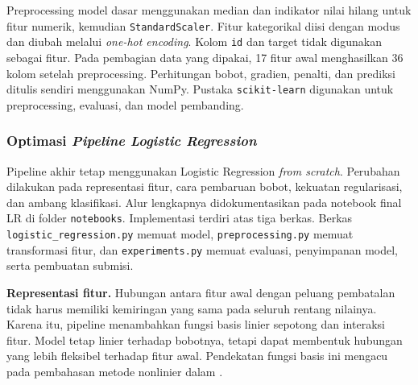 Preprocessing model dasar menggunakan median dan indikator nilai hilang untuk fitur numerik, kemudian \texttt{StandardScaler}. Fitur kategorikal diisi dengan modus dan diubah melalui \textit{one-hot encoding}. Kolom \texttt{id} dan target tidak digunakan sebagai fitur. Pada pembagian data yang dipakai, 17 fitur awal menghasilkan 36 kolom setelah preprocessing. Perhitungan bobot, gradien, penalti, dan prediksi ditulis sendiri menggunakan NumPy. Pustaka \texttt{scikit-learn} digunakan untuk preprocessing, evaluasi, dan model pembanding.

\subsubsection{Optimasi \textit{Pipeline Logistic Regression}}
\label{sec:pipeline-lr}

Pipeline akhir tetap menggunakan Logistic Regression \textit{from scratch}. Perubahan dilakukan pada representasi fitur, cara pembaruan bobot, kekuatan regularisasi, dan ambang klasifikasi. Alur lengkapnya didokumentasikan pada notebook final LR di folder \texttt{notebooks}. Implementasi terdiri atas tiga berkas. Berkas \texttt{logistic\_regression.py} memuat model, \texttt{preprocessing.py} memuat transformasi fitur, dan \texttt{experiments.py} memuat evaluasi, penyimpanan model, serta pembuatan submisi.

\textbf{Representasi fitur.}
Hubungan antara fitur awal dengan peluang pembatalan tidak harus memiliki kemiringan yang sama pada seluruh rentang nilainya. Karena itu, pipeline menambahkan fungsi basis linier sepotong dan interaksi fitur. Model tetap linier terhadap bobotnya, tetapi dapat membentuk hubungan yang lebih fleksibel terhadap fitur awal. Pendekatan fungsi basis ini mengacu pada pembahasan metode nonlinier dalam \cite{james2021islr}.

